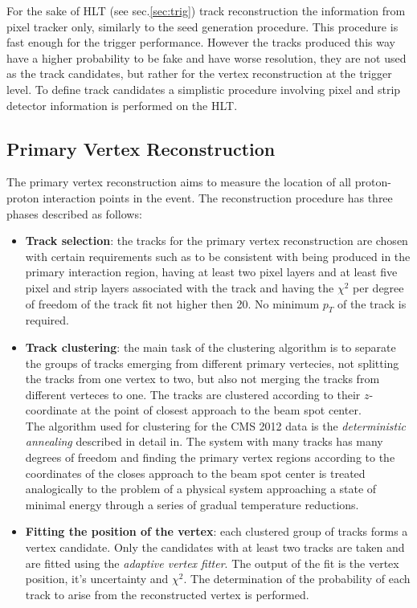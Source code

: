 For the sake of HLT (see sec.\ref{sec:trig}) track reconstruction the information from pixel tracker only, similarly to the seed generation procedure\cite{Chatrchyan:2014fea}.
This procedure is fast enough for the trigger performance. However the tracks produced this way have a higher probability to be fake and have worse resolution, they
are not used as the track candidates, but rather for the vertex reconstruction at the trigger level. To define track candidates a simplistic procedure
involving pixel and strip detector information is performed on the HLT\cite{Chatrchyan:2014fea}.

\subsection{Primary Vertex Reconstruction}

The primary vertex reconstruction aims to measure the location of all proton-proton interaction points in the event. The reconstruction procedure has three
phases described as follows\cite{Chatrchyan:2014fea}:

\begin{itemize}
 \item \textbf{Track selection}: the tracks for the primary vertex reconstruction are chosen with certain requirements such as to be consistent with being produced 
 in the primary interaction region, having at least two pixel layers and at least five pixel and strip layers associated with the track and having the $\chi^{2}$ per degree
 of freedom of the track fit not higher then 20. No minimum $p_{T}$ of the track is required.
 \item \textbf{Track clustering}: the main task of the clustering algorithm is to separate the groups of tracks emerging from different primary vertecies, not splitting 
 the tracks from one vertex to two, but also not merging the tracks from different verteces to one. The tracks are clustered according 
 to their $z$-coordinate at the point of closest approach to the beam spot center. 
 \\
 The algorithm used for clustering for the CMS 2012 data is the \textit{deterministic annealing} described in detail in\cite{rose_ieee1998}. The system with many tracks has many degrees
 of freedom and finding the primary vertex regions according to the coordinates of the closes approach to the beam spot center is treated analogically to the problem of a physical 
 system approaching a state of minimal energy through a series of gradual temperature reductions.
 \item \textbf{Fitting the position of the vertex}: each clustered group of tracks forms a vertex candidate. Only the candidates with at least two tracks are taken and are fitted
 using the \textit{adaptive vertex fitter}\cite{Frühwirth:1027031}. The output of the fit is the vertex position, it's uncertainty and $\chi^{2}$. The determination of the probability
 of each track to arise from the reconstructed vertex is performed.
\end{itemize}

